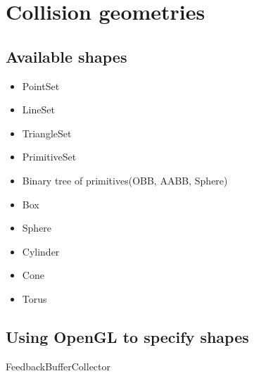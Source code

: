 \chapter{Collision geometries}

\section{Available shapes}

\begin{itemize}
\item PointSet
\item LineSet
\item TriangleSet
\item PrimitiveSet
\item Binary tree of primitives(OBB, AABB, Sphere)
\item Box
\item Sphere
\item Cylinder
\item Cone
\item Torus
\end{itemize}

\section{Using OpenGL to specify shapes}
FeedbackBufferCollector

